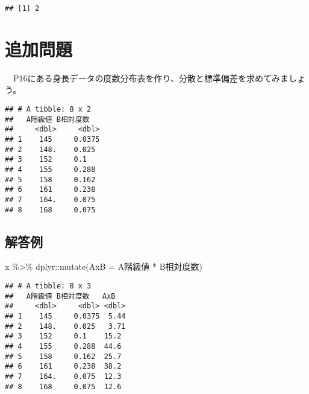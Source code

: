 \documentclass[
  12pt,
]{book}
\newenvironment{Shaded}{\begin{snugshade}}{\end{snugshade}}
\newcommand{\AttributeTok}[1]{\textcolor[rgb]{0.77,0.63,0.00}{#1}}
\newcommand{\FunctionTok}[1]{\textcolor[rgb]{0.00,0.00,0.00}{#1}}
\newcommand{\NormalTok}[1]{#1}
\newcommand{\OtherTok}[1]{\textcolor[rgb]{0.56,0.35,0.01}{#1}}
\newcommand{\SpecialCharTok}[1]{\textcolor[rgb]{0.00,0.00,0.00}{#1}}
\newcommand{\StringTok}[1]{\textcolor[rgb]{0.31,0.60,0.02}{#1}}
\begin{document}
\begin{verbatim}
## [1] 2
\end{verbatim}

\hypertarget{ux8ffdux52a0ux554fux984c-1}{%
\section*{追加問題}\label{ux8ffdux52a0ux554fux984c-1}}

　P16にある身長データの度数分布表を作り、分散と標準偏差を求めてみましょう。

\begin{verbatim}
## # A tibble: 8 x 2
##   A階級値 B相対度数
##     <dbl>     <dbl>
## 1    145     0.0375
## 2    148.    0.025 
## 3    152     0.1   
## 4    155     0.288 
## 5    158     0.162 
## 6    161     0.238 
## 7    164.    0.075 
## 8    168     0.075
\end{verbatim}

\hypertarget{ux89e3ux7b54ux4f8b-3}{%
\subsection*{解答例}\label{ux89e3ux7b54ux4f8b-3}}

\begin{Shaded}
\begin{Highlighting}[]
\NormalTok{x }\SpecialCharTok{\%\textgreater{}\%} 
\NormalTok{  dplyr}\SpecialCharTok{::}\FunctionTok{mutate}\NormalTok{(}\StringTok{\textasciigrave{}}\AttributeTok{AxB}\StringTok{\textasciigrave{}} \OtherTok{=} \StringTok{\textasciigrave{}}\AttributeTok{A階級値}\StringTok{\textasciigrave{}} \SpecialCharTok{*} \StringTok{\textasciigrave{}}\AttributeTok{B相対度数}\StringTok{\textasciigrave{}}\NormalTok{)}
\end{Highlighting}
\end{Shaded}

\begin{verbatim}
## # A tibble: 8 x 3
##   A階級値 B相対度数   AxB
##     <dbl>     <dbl> <dbl>
## 1    145     0.0375  5.44
## 2    148.    0.025   3.71
## 3    152     0.1    15.2 
## 4    155     0.288  44.6 
## 5    158     0.162  25.7 
## 6    161     0.238  38.2 
## 7    164.    0.075  12.3 
## 8    168     0.075  12.6
\end{verbatim}
\end{document}
